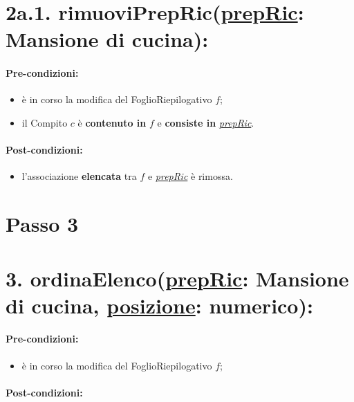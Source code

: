 \section*{2a.1. rimuoviPrepRic(\underline{prepRic}: Mansione di cucina):}

\paragraph{Pre-condizioni:}

\begin{itemize}
  \item è in corso la modifica del FoglioRiepilogativo $f$;
  \item il Compito $c$ è \textbf{contenuto in} $f$ e \textbf{consiste in} \underline{\textit{prepRic}}.    
\end{itemize}

\paragraph{Post-condizioni:}

\begin{itemize}
  \item l'associazione \textbf{elencata} tra $f$ e \underline{\textit{prepRic}} è rimossa.
\end{itemize}

\section{Passo 3}

\section*{3. ordinaElenco(\underline{prepRic}: Mansione di cucina, \underline{posizione}: numerico):}

\paragraph{Pre-condizioni:}

\begin{itemize}
  \item è in corso la modifica del FoglioRiepilogativo $f$;
\end{itemize}

\paragraph{Post-condizioni:}

